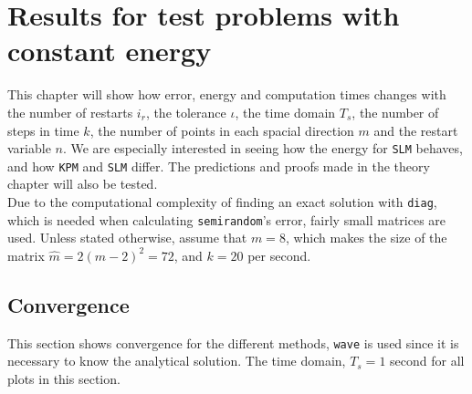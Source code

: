 \chapter{Results for test problems with constant energy}%
\label{sec:constres}
This chapter will show how error, energy and computation times changes with the number of restarts $i_r$, the tolerance $\iota$, the time domain $T_s$, the number of steps in time $k$, the number of points in each spacial direction $m$ and the restart variable $n$. We are especially interested in seeing how the energy for \texttt{SLM} behaves, and how \texttt{KPM} and \texttt{SLM} differ. The predictions and proofs made in the theory chapter will also be tested. \\

\noindent Due to the computational complexity of finding an exact solution with \texttt{diag}, which is needed when calculating \texttt{semirandom}'s error, fairly small matrices are used. Unless stated otherwise, assume that $m = 8$, which makes the size of the matrix $\hat{m} = 2(m-2)^2 = 72$, and $k = 20$ per second.

\section{Convergence}%
This section shows convergence for the different methods, \texttt{wave} is used since it is necessary to know the analytical solution. The time domain, $T_s = 1$ second for all plots in this section.

